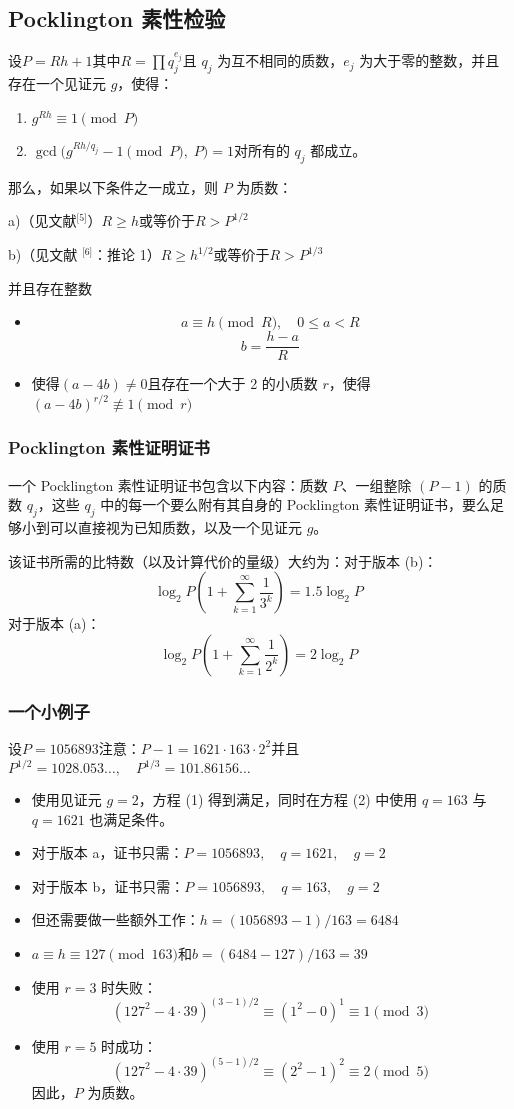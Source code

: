 \subsection{Pocklington 素性检验}
设$P = Rh + 1$其中$R = \prod q_j^{e_j}$且 $q_j$ 为互不相同的质数，$e_j$ 为大于零的整数，并且存在一个见证元 $g$，使得：
\begin{enumerate}
\item $g^{Rh} \equiv 1 \pmod{P}$
\item $\gcd\big(g^{Rh/q_j} - 1 \pmod{P},\; P\big) = 1$对所有的 $q_j$ 都成立。
\end{enumerate}
那么，如果以下条件之一成立，则 $P$ 为质数：

a)（见文献\(^\text{[5]}\)）$R \geq h$或等价于$R > P^{1/2}$

b)（见文献 \(^\text{[6]}\)：推论 1）$R \geq h^{1/2}$或等价于$R > P^{1/3}$

并且存在整数
\begin{itemize}
\item 
$$
a \equiv h \pmod{R}, \quad 0 \leq a < R~
$$
$$
b = \frac{h - a}{R}~
$$
\item 使得$(a - 4b) \neq 0$且存在一个大于 2 的小质数 $r$，使得$(a - 4b)^{r/2} \not\equiv 1 \pmod{r}$
\end{itemize}
\subsubsection{Pocklington 素性证明证书}
一个 Pocklington 素性证明证书包含以下内容：质数 $P$、一组整除 $(P-1)$ 的质数 $q_j$，这些 $q_j$ 中的每一个要么附有其自身的 Pocklington 素性证明证书，要么足够小到可以直接视为已知质数，以及一个见证元 $g$。

该证书所需的比特数（以及计算代价的量级）大约为：对于版本 (b)：
$$
\log_{2} P \left( 1 + \sum_{k=1}^{\infty} \frac{1}{3^k} \right) = 1.5 \log_{2} P~
$$
对于版本 (a)：
$$
\log_{2} P \left( 1 + \sum_{k=1}^{\infty} \frac{1}{2^k} \right) = 2 \log_{2} P~
$$
\subsubsection{一个小例子}
设$P = 1056893$注意：$P - 1 = 1621 \cdot 163 \cdot 2^{2}$并且$P^{1/2} = 1028.053\ldots, \quad P^{1/3} = 101.86156\ldots$
\begin{itemize}
\item 使用见证元 $g = 2$，方程 (1) 得到满足，同时在方程 (2) 中使用 $q = 163$ 与 $q = 1621$ 也满足条件。
\item 对于版本 a，证书只需：$P = 1056893, \quad q = 1621, \quad g = 2$
\item 对于版本 b，证书只需：$P = 1056893, \quad q = 163, \quad g = 2$
\item 但还需要做一些额外工作：$h = (1056893 - 1)/163 = 6484$
\item $a \equiv h \equiv 127 \pmod{163}$和$b = (6484 - 127)/163= 39$
\item 使用 $r = 3$ 时失败：
$$
\left(127^2 - 4 \cdot 39\right)^{(3-1)/2} \equiv (1^2 - 0)^{1} \equiv 1 \pmod{3}~
$$
\item 使用 $r = 5$ 时成功：
$$
\left(127^2 - 4 \cdot 39\right)^{(5-1)/2} \equiv (2^2 - 1)^2 \equiv 2 \pmod{5}~
$$
因此，$P$ 为质数。
\end{itemize}

